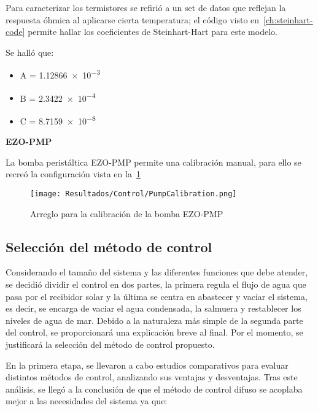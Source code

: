 			Para caracterizar los termistores se refirió a un set de datos que reflejan la respuesta óhmica al aplicarse cierta temperatura; el código visto en~\cref{ch:steinhart-code} permite hallar los coeficientes de Steinhart-Hart para este modelo.
			
			Se halló que:
			
			\begin{itemize}[columns=3]
				\item A = \num{1.12866e-3}
				\item B = \num{2.3422e-4}
				\item C = \num{8.7159e-8}
			\end{itemize}
			
			\textbf{EZO-PMP}\par
			
			La bomba peristáltica EZO-PMP permite una calibración manual, para ello se recreó la configuración vista en la~\cref{fig:Calibración-bomba}
			
			\begin{figure}[H]
				\centering
				\texttt{[image: Resultados/Control/PumpCalibration.png]}
				\caption{Arreglo para la calibración de la bomba EZO-PMP}
				\label{fig:Calibración-bomba}
			\end{figure}
			
		\subsection{Selección del método de control}
	
			Considerando el tamaño del sistema y las diferentes funciones que debe atender, se decidió dividir el control en dos partes, la primera regula el flujo de agua que pasa por el recibidor solar y la última se centra en abastecer y vaciar el sistema, es decir, se encarga de vaciar el agua condensada, la salmuera y restablecer los niveles de agua de mar. Debido a la naturaleza más simple de la segunda parte del control, se proporcionará una explicación breve al final. Por el momento, se justificará la selección del método de control propuesto.
			
		
			En la primera etapa, se llevaron a cabo estudios comparativos para evaluar distintos métodos de control, analizando sus ventajas y desventajas. Tras este análisis, se llegó a la conclusión de que el método de control difuso se acoplaba mejor a las necesidades del sistema ya que:
			
